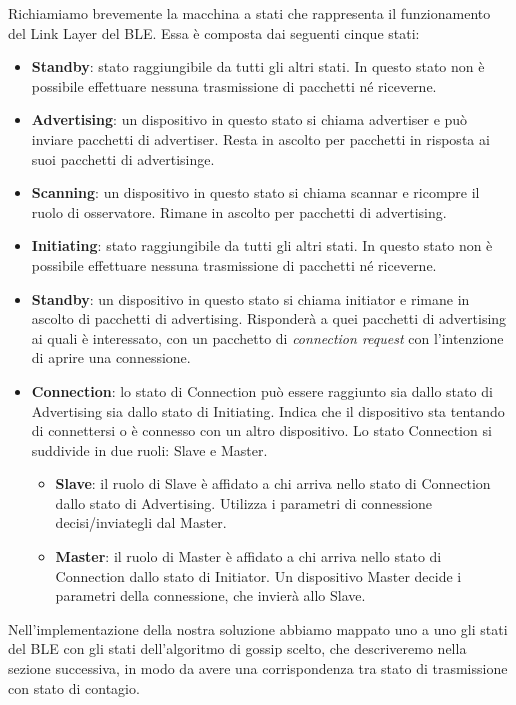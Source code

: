 Richiamiamo brevemente la macchina a stati che rappresenta il funzionamento del Link Layer del \acs{BLE}. Essa è composta dai seguenti cinque stati:
\begin{itemize}
	\item \textbf{Standby}: stato raggiungibile da tutti gli altri stati. In questo stato non è possibile effettuare nessuna trasmissione di pacchetti né riceverne.
	\item \textbf{Advertising}: un dispositivo in questo stato si chiama advertiser e può inviare pacchetti di advertiser. Resta in ascolto per pacchetti in risposta ai suoi pacchetti di advertisinge.
	\item \textbf{Scanning}: un dispositivo in questo stato si chiama scannar e ricompre il ruolo di osservatore. Rimane in ascolto per pacchetti di advertising.
	\item \textbf{Initiating}: stato raggiungibile da tutti gli altri stati. In questo stato non è possibile effettuare nessuna trasmissione di pacchetti né riceverne.
	\item \textbf{Standby}: un dispositivo in questo stato si chiama initiator e rimane in ascolto di pacchetti di advertising. Risponderà a quei pacchetti di advertising ai quali è interessato, con un pacchetto di \textit{connection request} con l'intenzione di aprire una connessione.
	\item \textbf{Connection}: lo stato di Connection può essere raggiunto sia dallo stato di Advertising sia dallo stato di Initiating. Indica che il dispositivo sta tentando di connettersi o è connesso con un altro dispositivo. Lo stato Connection si suddivide in due ruoli: Slave e Master.
	\begin{itemize}
		\item \textbf{Slave}: il ruolo di Slave è affidato a chi arriva nello stato di Connection dallo stato di Advertising. Utilizza i parametri di connessione decisi/inviategli dal Master.
		\item \textbf{Master}: il ruolo di Master è affidato a chi arriva nello stato di Connection dallo stato di Initiator. Un dispositivo Master decide i parametri della connessione, che invierà allo Slave.
	\end{itemize}
\end{itemize}
Nell'implementazione della nostra soluzione abbiamo mappato uno a uno gli stati del \acs{BLE} con gli stati dell'algoritmo di gossip scelto, che descriveremo nella sezione successiva, in modo da avere una corrispondenza tra stato di trasmissione con stato di contagio.
